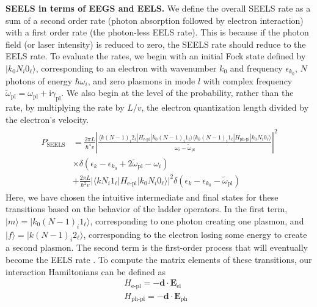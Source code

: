 \documentclass [11pt, proquest] {uwthesis}[2016/11/22]
\begin{document}
{\bf SEELS in terms of EEGS and EELS.} We define the overall SEELS rate as a sum of a second order rate (photon absorption followed by electron interaction) with a first order rate (the photon-less EELS rate). This is because if the photon field (or laser intensity) is reduced to zero, the SEELS rate should reduce to the EELS rate. To evaluate the rates, we begin with an initial Fock state defined by $|k_0N_i0_{\ell}\rangle$, corresponding to an electron with wavenumber $k_0$ and frequency $\epsilon_{k_0}$, $N$ photons of energy $\hbar\omega_i$, and zero plasmons in mode $l$ with complex frequency $\tilde{\omega}_{\textrm{pl}}=\omega_{\textrm{pl}}+\textrm{i}\gamma_{\textrm{pl}}$. We also begin at the level of the probability, rather than the rate, by multiplying the rate by $L/v$, the electron quantization length divided by the electron's velocity.
\begin{align}
\begin{split}
  P_{\textrm{SEELS}} &= \frac{2\pi L}{\hbar^4v}\left|\frac{\langle k(N-1)_i2_{\ell}|H_{\textrm{e-pl}}|k_0(N-1)_i1_{\ell}\rangle\langle k_0(N-1)_i1_{\ell}|H_{\textrm{ph-pl}}|k_0N_i0_{\ell}\rangle}{\omega_i - \tilde{\omega}_{\textrm{pl}}}\right|^2\\
  & \times\delta(\epsilon_k - \epsilon_{k_0} + 2\tilde{\omega}_{\textrm{pl}} - \omega_i)\\
  &+ \frac{2\pi L}{\hbar^2v}|\langle kN_i1_{\ell}|H_{\textrm{e-pl}}|k_0N_i0_{\ell}\rangle|^2\delta(\epsilon_k - \epsilon_{k_0} - \tilde{\omega}_{\textrm{pl}})
  \label{overall_rate}
  \end{split}
\end{align}
Here, we have chosen the intuitive intermediate and final states for these transitions based on the behavior of the ladder operators. In the first term, $|m\rangle = |k_0(N-1)_i1_{\ell}\rangle$, corresponding to one photon creating one plasmon, and $|f\rangle = |k (N-1)_i 2_{\ell}\rangle$, corresponding to the electron losing some energy to create a second plasmon. The second term is the first-order process that will eventually become the EELS rate \cite{EEGS}. To compute the matrix elements of these transitions, our interaction Hamiltonians can be defined as
\begin{equation}
\begin{aligned}
H_{\textrm{e-pl}} = -\textbf{d} \cdot \textbf{E}_{\textrm{el}}&\\
H_{\textrm{ph-pl}} = -\textbf{d} \cdot \textbf{E}_{\textrm{ph}}&
\end{aligned}
\end{equation}
\end{document}
